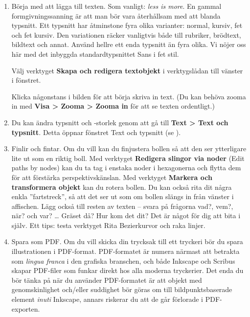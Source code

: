 \documentclass[a4paper,final]{memoir} %
\begin{document}
\begin{enumerate}

\item Börja med att lägga till texten. Som vanligt: \textit{less is more}. En gammal formgivningssanning är att man bör vara återhållsam med att blanda typsnitt. Ett typsnitt har åtminstone fyra olika varianter: normal, kursiv, fet och fet kursiv. Den variationen räcker vanligtvis både till rubriker, brödtext, bildtext och annat. Använd hellre ett enda typsnitt än fyra olika. Vi nöjer oss här med det inbyggda standardtypsnittet Sans i fet stil.

Välj verktyget \textbf{Skapa och redigera textobjekt} i verktygslådan till vänster i fönstret.


Klicka någonstans i bilden för att börja skriva in text. (Du kan behöva zooma in med \textbf{Visa \textgreater{} Zooma \textgreater{} Zooma in} för att se texten ordentligt.)

\item Du kan ändra typsnitt och -storlek genom att gå till \textbf{Text \textgreater{} Text och typsnitt}. Detta öppnar fönstret Text och typsnitt (se ).



\item Finlir och fintar. Om du vill kan du finjustera bollen så att den ser ytterligare lite ut som en riktig boll. Med verktyget \textbf{Redigera slingor via noder} (Edit paths by nodes) kan du ta tag i enstaka noder i hexagonerna och flytta dem för att förstärka perspektivskänslan. Med verktyget \textbf{Markera och transformera objekt} kan du rotera bollen. Du kan också rita dit några enkla ''fartstreck'', så att det ser ut som om bollen slängs in från vänster i affischen. Lägg också till resten av texten -- svara på frågorna vad?, vem?, när? och var? \ldots{} Gräset då? Hur kom det dit? Det är något för dig att bita i själv. Ett tips: testa verktyget Rita Bezierkurvor och raka linjer.


\item Spara som PDF. Om du vill skicka din trycksak till ett tryckeri bör du spara illustrationen i PDF-format. PDF-formatet är numera närmast att betrakta som \textit{lingua franca} i den grafiska branschen, och både Inkscape och Scribus skapar PDF-filer som funkar direkt hos alla moderna tryckerier. Det enda du bör tänka på när du använder PDF-formatet är att objekt med genomskinlighet och/eller suddighet bör göras om till bildpunktsbaserade element \textit{inuti} Inkscape, annars riskerar du att de går förlorade i PDF-exporten. 


\end{enumerate}
\end{document}
